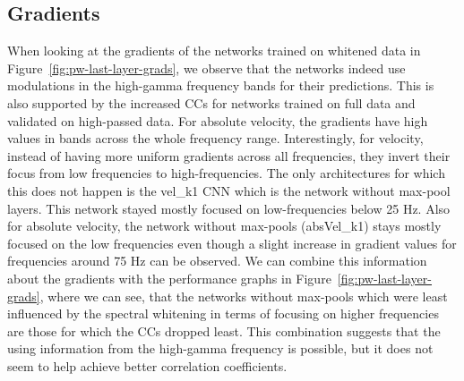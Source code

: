 \subsection{Gradients}\label{subsec:pw-gradients2}

When looking at the gradients of the networks trained on whitened data in Figure~\ref{fig:pw-last-layer-grads}, we observe that the networks indeed use modulations in the high-gamma frequency bands for their predictions.
This is also supported by the increased CCs for networks trained on full data and validated on high-passed data.
For absolute velocity, the gradients have high values in bands across the whole frequency range. Interestingly, for velocity, instead of having more uniform gradients across all frequencies, they invert their focus from low frequencies to high-frequencies.
The only architectures for which this does not happen is the vel\_k1 CNN which is the network without max-pool layers.
This network stayed mostly focused on low-frequencies below 25 Hz.
Also for absolute velocity, the network without max-pools (absVel\_k1) stays mostly focused on the low frequencies even though a slight increase in gradient values for frequencies around 75 Hz can be observed. 
We can combine this information about the gradients with the performance graphs in Figure~\ref{fig:pw-last-layer-grads}, where we can see, that the networks without max-pools which were least influenced by the spectral whitening in terms of focusing on higher frequencies are those for which the CCs dropped least.
This combination suggests that the using information from the high-gamma frequency is possible, but it does not seem to help achieve better correlation coefficients.

